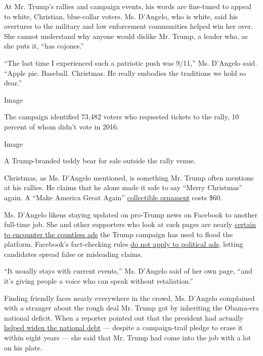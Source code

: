 At Mr. Trump's rallies and campaign events, his words are fine-tuned to
appeal to white, Christian, blue-collar voters. Ms. D'Angelo, who is
white, said his overtures to the military and law enforcement
communities helped win her over. She cannot understand why anyone would
dislike Mr. Trump, a leader who, as she puts it, ``has cojones.''

``The last time I experienced such a patriotic push was 9/11,'' Ms.
D'Angelo said. ``Apple pie. Baseball. Christmas. He really embodies the
traditions we hold so dear.''

Image

The campaign identified 73,482 voters who requested tickets to the
rally, 10 percent of whom didn't vote in 2016.

Image

A Trump-branded teddy bear for sale outside the rally venue.

Christmas, as Ms. D'Angelo mentioned, is something Mr. Trump often
mentions at his rallies. He claims that he alone made it safe to say
``Merry Christmas'' again. A ``Make America Great Again''
\href{https://shop.donaldjtrump.com/products/keep-america-great-collectible-ornament}{collectible
ornament} costs \$60.

Ms. D'Angelo likens staying updated on pro-Trump news on Facebook to
another full-time job. She and other supporters who look at such pages
are nearly
\href{https://www.nytimes.com/2019/10/20/us/elections/trump-campaign-ads-democrats.html}{certain
to encounter the countless ads} the Trump campaign has used to flood the
platform. Facebook's fact-checking rules
\href{https://www.nytimes.com/2019/10/08/technology/facebook-trump-biden-ad.html}{do
not apply to political ads}, letting candidates spread false or
misleading claims.

``It usually stays with current events,'' Ms. D'Angelo said of her own
page, ``and it's giving people a voice who can speak without
retaliation.''

Finding friendly faces nearly everywhere in the crowd, Ms. D'Angelo
complained with a stranger about the rough deal Mr. Trump got by
inheriting the Obama-era national deficit. When a reporter pointed out
that the president had actually
\href{https://www.businessinsider.com/national-debt-deficit-trump-how-it-compares-obama-bush-clinton-2019-11}{helped
widen the national debt} --- despite a campaign-trail pledge to erase it
within eight years --- she said that Mr. Trump had come into the job
with a lot on his plate.

